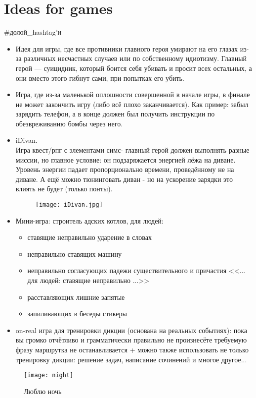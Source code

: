 \section{Ideas for games}
\begin{epigraph}
    \#долой\_hashtag'и
\end{epigraph}

\begin{itemize}
\item Идея для игры, где все противники главного героя умирают на его глазах из-за различных несчастных случаев или по собственному идиотизму.
Главный герой --- суицидник, который боится себя убивать и просит всех остальных, а они вместо этого гибнут сами, при попытках его убить.
\item Игра, где из-за маленькой оплошности совершенной в начале игры, в финале не может закончить игру (либо всё плохо заканчивается).
Как пример: забыл зарядить телефон, а в конце должен был получить инструкции по обезвреживанию бомбы через него.
\item iDivan.\\
Игра квест/рпг с элементами симс- главный герой должен выполнять разные миссии, но главное условие: он подзаряжается энергией лёжа на диване.
Уровень энергии падает пропорционально времени, проведённому не на диване. А ещё можно тюнинговать диван - но на ускорение зарядки это влиять
не будет (только понты).

\begin{figure}[ht!]
    \center
    \texttt{[image: iDivan.jpg]}
\end{figure}

\item Мини-игра: строитель адских котлов, для людей:
\begin{itemize}
\item ставящие неправильно ударение в словах\\
\item неправильно ставящих машину\\
\item неправильно согласующих падежи существительного и причастия <<... для людей: ставящие неправильно ...>>\\
\item расставляющих лишние запятые\\
\item запиливающих в беседы стикеры 
\end{itemize}
\item on-real игра для тренировки дикции (основана на реальных событиях): пока вы громко отчётливо и грамматически правильно не произнесёте
требуемую фразу маршрутка не останавливается + можно также использовать не только тренировку дикции: решение задач, написание сочинений
и многое другое...
\end{itemize}
\begin{figure}[ht!]
    \centering
    \texttt{[image: night]}
    \caption{Люблю ночь}
\end{figure}
